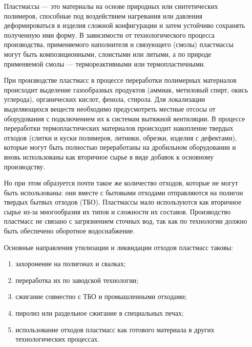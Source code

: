Пластмассы — это материалы на основе природных или синтетических полимеров, способные
под воздействием нагревания или давления деформироваться в изделия сложной конфигурации
и затем устойчиво сохранять полученную ими форму. В зависимости от технологического
процесса производства, применяемого наполнителя и связующего (смолы) пластмассы могут
быть композиционными, слоистыми или литыми, а по природе применяемой
смолы — термореактивными или термопластичными.

При производстве пластмасс в процессе переработки полимерных материалов происходит
выделение газообразных продуктов (аммиак, метиловый спирт, окись углерода), органических
кислот, фенола, стирола. Для локализации выделяющихся веществ необходимо предусмотреть
местные отсосы от оборудования с подключением их к системам вытяжной вентиляции.
В процессе переработки термопластических материалов происходит накопление твердых
отходов (слитки и куски полимеров, литники, обрезки, изделия с дефектами), которые
могут быть полностью переработаны на дробильном оборудовании и вновь использованы
как вторичное сырье в виде добавок к основному производству.

Но при этом образуется почти такое же количество отходов, которые не могут быть
использованы: они вместе с бытовыми отходами отправляются на полигон твердых
бытвых отходов (ТБО). Пластмассы мало используются как вторичное сырье из-за многообразия их типов
и сложности их составов. Производство пластмасс не связано с загрязнением сточных
вод, так как по технологии должно быть обеспечено оборотное водоснабжение.

Основные направления утилизации и ликвидации отходов пластмасс таковы:
\begin{enumerate}
\item захоронение на полигонах и свалках;
\item переработка их по заводской технологии;
\item сжигание совместно с ТБО и промышленными отходами;
\item пиролиз или раздельное сжигание в специальных печах;
\item использование отходов пластмасс как готового материала в других технологических процессах.
\end{enumerate}

